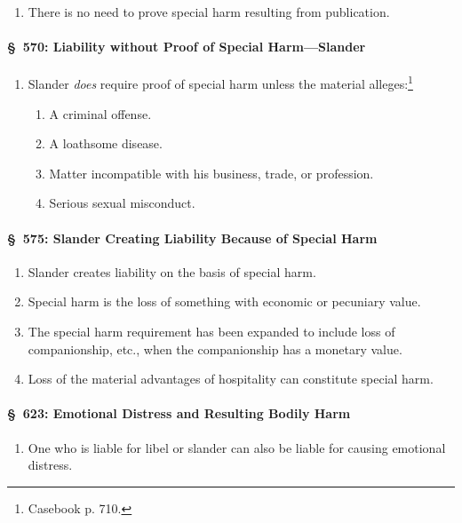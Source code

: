 \begin{enumerate}
    \item There is no need to prove special harm resulting from publication.
\end{enumerate}

\paragraph{\S\ 570: Liability without Proof of Special Harm---Slander}

\begin{enumerate}
    \item Slander \emph{does} require proof of special harm unless the 
    material alleges:\footnote{Casebook p. 710.}
    \begin{enumerate}
        \item A criminal offense.
        \item A loathsome disease.
        \item Matter incompatible with his business, trade, or profession.
        \item Serious sexual misconduct.
    \end{enumerate}
\end{enumerate}

\paragraph{\S\ 575: Slander Creating Liability Because of Special Harm}

\begin{enumerate}
    \item Slander creates liability on the basis of special harm.
    \item Special harm is the loss of something with economic or pecuniary 
    value.
    \item The special harm requirement has been expanded to include loss of 
    companionship, etc., when the companionship has a monetary value. 
    \item Loss of the material advantages of hospitality can constitute 
    special harm.
\end{enumerate}

\paragraph{\S\ 623: Emotional Distress and Resulting Bodily Harm}

\begin{enumerate}
    \item One who is liable for libel or slander can also be liable for 
    causing emotional distress.
\end{enumerate}

